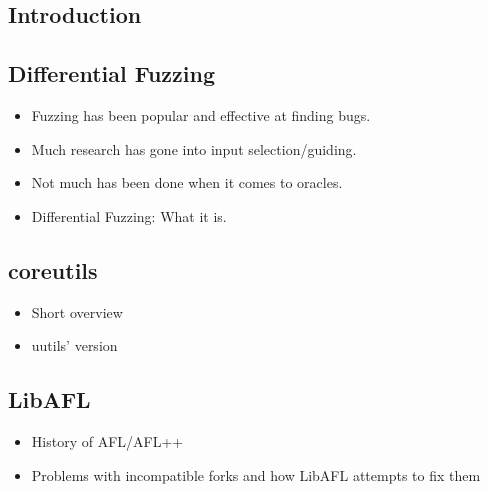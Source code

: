 \documentclass{article}
\begin{document}
\begin{multicols}{2}
    \section{Introduction}
    \subsection{Differential Fuzzing}
    \begin{itemize}
        \item Fuzzing has been popular and effective at finding bugs.
        \item Much research has gone into input selection/guiding.
        \item Not much has been done when it comes to oracles.
        \item Differential Fuzzing: What it is.
    \end{itemize}

    \subsection{coreutils}
    \begin{itemize}
        \item Short overview
        \item uutils' version
    \end{itemize}

    \subsection{LibAFL}
    \label{LibAFLHistory}
    \begin{itemize}
        \item History of AFL/AFL++
        \item Problems with incompatible forks and how LibAFL attempts to fix them
    \end{itemize}


\end{multicols}
\end{document}

